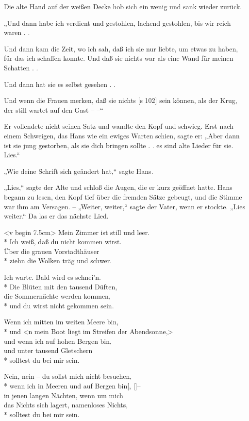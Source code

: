 Die alte Hand auf der weißen Decke hob sich
ein wenig und sank wieder zurück.

„Und dann habe ich verdient und gestohlen,
lachend gestohlen, bis wir reich waren . .

Und dann kam die Zeit, wo ich sah, daß ich
sie nur liebte, um etwas zu haben, für das ich schaffen
konnte. Und daß sie nichts war als eine Wand
für meinen Schatten . .

Und dann hat sie es selbst gesehen . .

Und wenn die Frauen merken, daß sie nichts
[s 102]
sein können, als der Krug, der still wartet auf den
Gast – –“

Er vollendete nicht seinen Satz und wandte den
Kopf und schwieg. Erst nach einem Schweigen, das
Hans wie ein ewiges Warten schien, sagte er: „Aber
dann ist sie jung gestorben, als sie dich bringen
sollte . . es sind alte Lieder für sie. Lies.“

„Wie deine Schrift sich geändert hat,“ sagte Hans.

„Lies,“ sagte der Alte und schloß die Augen,
die er kurz geöffnet hatte. Hans begann zu lesen,
den Kopf tief über die fremden Sätze gebeugt, und
die Stimme war ihm am Versagen. – „Weiter,
weiter,“ sagte der Vater, wenn er stockte. „Lies
weiter.“ Da las er das nächste Lied.

<v begin 7.5cm>
Mein Zimmer ist still und leer.\\*
Ich weiß, daß du nicht kommen wirst.\\
Über die grauen Vorstadthäuser\\*
ziehn die Wolken träg und schwer.

Ich warte. Bald wird es schnei'n.\\*
Die Blüten mit den tausend Düften,\\
die Sommernächte werden kommen,\\*
und du wirst nicht gekommen sein.

Wenn ich mitten im weiten Meere bin,\\*
und <n mein Boot liegt im Streifen der Abendsonne,>\\
und wenn ich auf hohen Bergen bin,\\
[s 103]
und unter tausend Gletschern\\*
solltest du bei mir sein.

Nein, nein – du sollst mich nicht besuchen,\\*
wenn ich in Meeren und auf Bergen bin[, |]–\\
in jenen langen Nächten, wenn um mich\\
das Nichts sich lagert, namenloses Nichts,\\*
solltest du bei mir sein.

